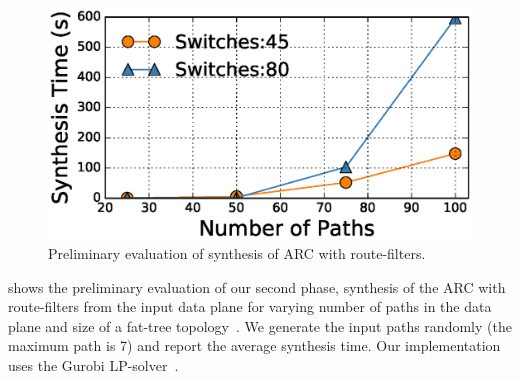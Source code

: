 \begin{figure}
	\centering
	\includegraphics[width=0.7\columnwidth]{figures/evaluation.eps}
	\caption{Preliminary evaluation of synthesis of ARC with
	route-filters.} \label{fig:evaluation}
\end{figure}
  shows 
the preliminary evaluation of our second phase, synthesis 
of the ARC with route-filters from the input data plane 
for varying number of paths in the data plane and size 
of a fat-tree topology~\cite{fattree}. 
We generate the input paths randomly
(the maximum path is 7) and report the average 
synthesis time. Our implementation uses the Gurobi 
LP-solver~\cite{gurobi}. 
%




